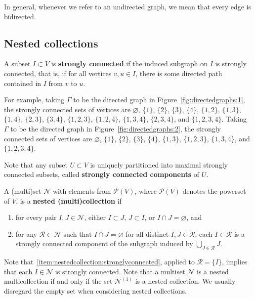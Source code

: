 \documentclass[11pt]{article}
\theoremstyle{definition}
\numberwithin{equation}{section}
\newcommand{\vocab}[1]{\textbf{#1}}
\newcommand{\mtp}[1]{^{(#1)}} \newcommand{\graph}{\varGamma}
\newcommand{\vertices}{V}
\newcommand{\powerset}[1]{\mathcal{P}(#1)}
\begin{document}
In general, whenever we refer to an undirected graph, we mean that every edge is bidirected. 

\subsection{Nested collections} \label{subsection:nestedcollections}

A subset \(I \subset \vertices\) is \vocab{strongly connected} if the induced subgraph on \(I\) is strongly connected, that is, if for all vertices \(v, u \in I\), there is some directed path contained in \(I\) from \(v\) to \(u\).

For example,
taking \(\graph\) to be the directed graph in Figure~\ref{fig:directedgraphs:1},
the strongly connected sets of vertices are \(\varnothing\), \(\{1\}\), \(\{2\}\), \(\{3\}\), \(\{4\}\), \(\{1, 2\}\), \(\{1, 3\}\), \(\{1, 4\}\), \(\{2, 3\}\), \(\{3, 4\}\), \(\{1, 2, 3\}\), \(\{1, 2, 4\}\), \(\{1, 3, 4\}\), \(\{2, 3, 4\}\), and \(\{1, 2, 3, 4\}\).
Taking \(\graph\) to be the directed graph in Figure~\ref{fig:directedgraphs:2},
the strongly connected sets of vertices are \(\varnothing\), \(\{1\}\), \(\{2\}\), \(\{3\}\), \(\{4\}\), \(\{1, 3\}\), \(\{1, 2, 3\}\), \(\{1, 3, 4\}\), and \(\{1, 2, 3, 4\}\).

Note that any subset \(U \subset \vertices\) is uniquely partitioned into maximal strongly connected subsets, called \vocab{strongly connected components} of \(U\).

A (multi)set \(\mathcal{N}\) with elements from \(\powerset{\vertices}\), where \(\powerset{\vertices}\) denotes the powerset of \(\vertices\),
is a \vocab{nested (multi)collection} if
\begin{enumerate}[label = (N\arabic*), ref = (N\arabic*), leftmargin = .6in]
    \item \label{item:nestedcollection:disjoint}
    for every pair \(I, J \in \mathcal{N}\),
    either \(I \subset J\), \(J \subset I\), or \(I \cap J = \varnothing\), and
    \item \label{item:nestedcollection:stronglyconnected}
    for any \(\mathcal{R} \subset \mathcal{N}\) such that \(I \cap J = \varnothing\) for all distinct \(I, J \in \mathcal{R}\),
    each \(I \in \mathcal{R}\) is a strongly connected component of the subgraph induced by \(\bigcup_{J \in \mathcal{R}} J\).
\end{enumerate}

Note that~\ref{item:nestedcollection:stronglyconnected}, applied to \(\mathcal{R} = \{I\}\), implies that each \(I \in \mathcal{N}\) is strongly connected.
Note that a multiset \(\mathcal{N}\) is a nested multicollection if and only if the set \(\mathcal{N}\mtp{1}\) is a nested collection.
We usually disregard the empty set when considering nested collections.
\end{document}
